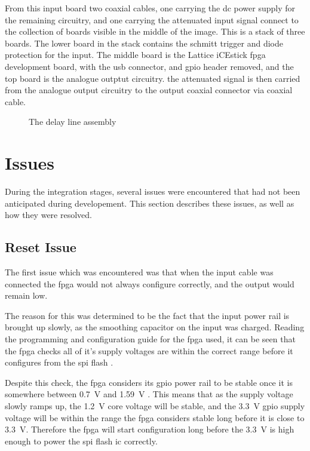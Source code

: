 From this input board two coaxial cables, one carrying the \gls{dc} power supply for the remaining circuitry, and one carrying the attenuated input signal connect to the collection of boards visible in the middle of the image. This is a stack of three boards. The lower board in the stack contains the schmitt trigger and diode protection for the input. The middle board is the Lattice iCEstick \gls{fpga} development board, with the \gls{usb} connector, and \gls{gpio} header removed, and the top board is the analogue outptut circuitry. the attenuated signal is then carried from the analogue output circuitry to the output coaxial connector via coaxial cable.

\begin{figure}[ht]
	\centering
	\caption{The delay line assembly}
	\label{fig:delay-line-assy}
\end{figure}



\section{Issues}

During the integration stages, several issues were encountered that had not been anticipated during developement. This section describes these issues, as well as how they were resolved.

\subsection{ Reset Issue}
The first issue which was encountered was that when the input cable was connected the \gls{fpga} would not always configure correctly, and the output would remain low.

The reason for this was determined to be the fact that the input power rail is brought up slowly, as the smoothing capacitor on the input was charged. Reading the programming and configuration guide for the \gls{fpga} used, it can be seen that the \gls{fpga} checks all of it's supply voltages are within the correct range before it configures from the \gls{spi} flash \cite[p.4]{lattice2016}.

Despite this check, the \gls{fpga} considers its \gls{gpio} power rail to be stable once it is somewhere between \SI{0.7}{\volt} and \SI{1.59}{\volt} \cite[p.3-2]{lattice2017a}. This means that as the supply voltage slowly ramps up, the \SI{1.2}{\volt} core voltage will be stable, and the \SI{3.3}{\volt} \gls{gpio} supply voltage will be within the range the \gls{fpga} considers stable long before it is close to \SI{3.3}{\volt}. Therefore the \gls{fpga} will start configuration long before the \SI{3.3}{\volt} is high enough to power the \gls{spi} flash \gls{ic} correctly.

